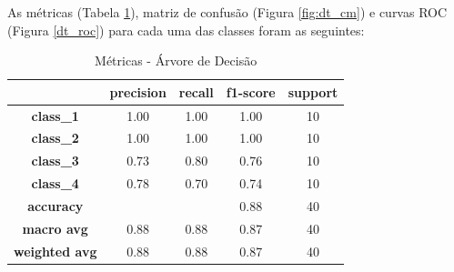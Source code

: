 \documentclass[
	article,			%
	11pt,				%
	oneside,			%
	a4paper,			%
	english,			%
	brazil,				%
	sumario=tradicional
	]{abntex2}
\begin{document}
As métricas (Tabela \ref{tab:dt_01}), matriz de confusão (Figura \ref{fig:dt_cm}) e curvas ROC (Figura \ref{dt_roc}) para cada uma das classes foram as seguintes:

\begin{table}[]
\centering
\begin{tabular}{c|c|c|c|c|}
\cline{2-5}
                                            & \textbf{precision} & \textbf{recall} & \textbf{f1-score} & \textbf{support} \\ \hline
\multicolumn{1}{|c|}{\textbf{class\_1}}     & 1.00               & 1.00            & 1.00              & 10               \\ \hline
\multicolumn{1}{|c|}{\textbf{class\_2}}     & 1.00               & 1.00            & 1.00              & 10               \\ \hline
\multicolumn{1}{|c|}{\textbf{class\_3}}     & 0.73               & 0.80            & 0.76              & 10               \\ \hline
\multicolumn{1}{|c|}{\textbf{class\_4}}     & 0.78               & 0.70            & 0.74              & 10               \\ \hline
\multicolumn{1}{|c|}{\textbf{accuracy}}     &                    &                 & 0.88              & 40               \\ \hline
\multicolumn{1}{|c|}{\textbf{macro avg}}    & 0.88               & 0.88            & 0.87              & 40               \\ \hline
\multicolumn{1}{|c|}{\textbf{weighted avg}} & 0.88               & 0.88            & 0.87              & 40               \\ \hline
\end{tabular}
\caption{Métricas - Árvore de Decisão}
\label{tab:dt_01}
\end{table}
\end{document}
